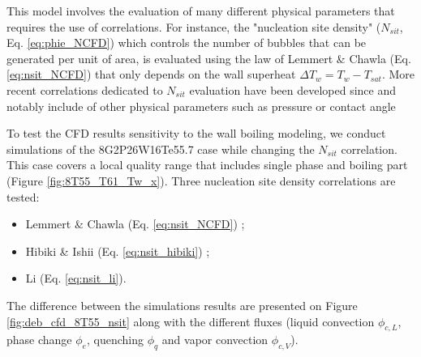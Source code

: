 \npar

This model involves the evaluation of many different physical parameters that requires the use of correlations. For instance, the "nucleation site density" ($N_{sit}$, Eq. \ref{eq:phie_NCFD}) which controls the number of bubbles that can be generated per unit of area, is evaluated using the law of Lemmert \& Chawla \cite{lemmert_influence_1977} (Eq. \ref{eq:nsit_NCFD}) that only depends on the wall superheat $\Delta T_{w} = T_{w}-T_{sat}$. More recent correlations dedicated to $N_{sit}$ evaluation have been developed since and notably include of other physical parameters such as pressure or contact angle \cite{hibiki_active_2003, li_development_2018, zhou_experimental_2020, basu_wall_2005}

\npar

To test the CFD results sensitivity to the wall boiling modeling, we conduct simulations of the 8G2P26W16Te55.7 case while changing the $N_{sit}$ correlation. This case covers a local quality range that includes single phase and boiling part (Figure \ref{fig:8T55_T61_Tw_x}). Three nucleation site density correlations are tested:

\begin{itemize}
\item Lemmert \& Chawla \cite{lemmert_influence_1977} (Eq. \ref{eq:nsit_NCFD}) ;
\item Hibiki \& Ishii \cite{hibiki_active_2003} (Eq. \ref{eq:nsit_hibiki}) ;
\item Li \etal \cite{li_development_2018} (Eq. \ref{eq:nsit_li}).
\end{itemize}

The difference between the simulations results are presented on Figure \ref{fig:deb_cfd_8T55_nsit} along with the different fluxes (liquid convection $\phi_{c,L}$, phase change $\phi_{e}$, quenching $\phi_{q}$ and vapor convection $\phi_{c,V}$). 


